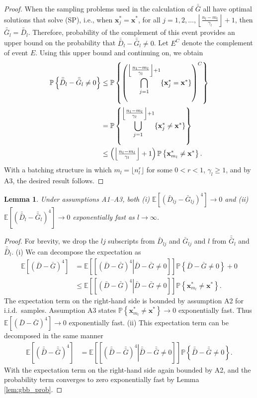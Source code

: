 \documentclass[12pt]{article}
\newtheorem{lemma}{Lemma}
\newcommand{\p}[1]{\mathbb{P} \left\{ #1 \right\}}
\newcommand{\e}[1]{\mathbb{E} \left[ #1 \right]
}
\newcommand{\x}{\mathbf{x}}
\newcommand{\xs}{\x^*}
\newcommand{\nbl}{\left\lfloor\tfrac{n_l-m_l}{\gamma_l}\right\rfloor+1}
\newcommand{\gb}{\bar{G}}
\newcommand{\gbb}{\bar{\gb}}
\newcommand{\db}{\bar{D}}
\newcommand{\dbb}{\bar{\db}}
\begin{document}
\begin{proof} When the sampling problems used in the calculation of $\gbb$ all have optimal solutions that solve (SP), i.e., when $\xs_{j} = \xs$, for all $j=1,2,\ldots, \nbl$, then $\gbb_l = \dbb_l$. 
Therefore, probability of the complement of this event provides an upper bound on the probability that $\dbb_l - \gbb_l \neq 0$. 
Let $E^C$ denote the complement of event $E$. 
Using this upper bound and continuing on, we obtain
	\begin{align}
		\p{\dbb_l - \gbb_l \neq 0} & \leq \p{\left( \bigcap_{j=1}^{\nbl} \{\xs_{j} = \xs\} \right)^C} \notag \\
		& = \p{ \bigcup_{j=1}^{\nbl} \{\xs_{j} \neq \xs\}} \notag \\
		& \leq \left( \nbl\right) \p{ \xs_{m_l} \neq \xs }. \notag
	\end{align}
	With a batching structure in which $m_l = \lfloor n_l^{r} \rfloor$ for some $0<r<1$,  $\gamma_l \geq 1$, and by A3, the desired result follows.
\end{proof}

\begin{lemma} \label{lem:gb_gbb_l4}
	Under assumptions A1--A3, both (i) $\e{(\db_{lj} - \gb_{lj})^4} \rightarrow 0$ and (ii) $\e{(\dbb_l - \gbb_l)^4} \rightarrow 0$ exponentially fast as $l \rightarrow \infty$.
\end{lemma}

\begin{proof}
	For brevity, we drop the $lj$ subscripts from $\db_{lj}$ and $\gb_{lj}$ and $l$ from $\gbb_l$ and $\dbb_l$.
	(i) We can decompose the expectation as
	\begin{align*}
		\e{(\db - \gb)^4} & = \e{\left[ \left.(\db - \gb)^4 \right| \db - \gb \neq 0\right]} \p{\db - \gb \neq 0} + 0\\
		& \leq \e{\left[ \left.(\db - \gb)^4 \right| \db - \gb \neq 0 \right]} \p{ \xs_{m_l}  \neq \xs}.
	\end{align*}
	The expectation term on the right-hand side is bounded by assumption A2 for i.i.d.\ samples.  
        Assumption A3 states $\p{\xs_{m_l} \neq \xs} \rightarrow 0$ exponentially fast.  
        Thus $\e{(\db - \gb)^4} \rightarrow 0$ exponentially fast.
(ii) This expectation term can be decomposed in the same manner
	\begin{align*}
		\e{(\dbb - \gbb)^4} & = \e{\left[ \left. (\dbb - \gbb)^4 \right| \dbb - \gbb \neq 0\right]} \p{\dbb - \gbb \neq 0}.
	\end{align*}
	With the expectation term on the right-hand side again bounded by A2, and the probability term converges to zero exponentially fast by Lemma \ref{lem:gbb_prob}.
\end{proof}
\end{document}
